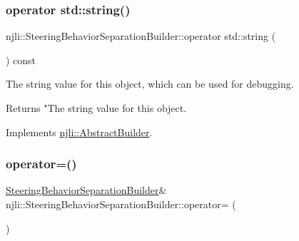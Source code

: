 \subsubsection{\texorpdfstring{operator std\+::string()}{operator std::string()}}
{\footnotesize\ttfamily njli\+::\+Steering\+Behavior\+Separation\+Builder\+::operator std\+::string (\begin{DoxyParamCaption}{ }\end{DoxyParamCaption}) const\hspace{0.3cm}{\ttfamily [virtual]}}

The string value for this object, which can be used for debugging.

\begin{DoxyReturn}{Returns}
"The string value for this object. 
\end{DoxyReturn}


Implements \mbox{\hyperlink{classnjli_1_1_abstract_builder_a3e6e553e06d1ca30517ad5fb0bd4d000}{njli\+::\+Abstract\+Builder}}.

\mbox{\label{classnjli_1_1_steering_behavior_separation_builder_a51689c329131ef5119e3c0c0d96a2c4a}} 
\subsubsection{\texorpdfstring{operator=()}{operator=()}}
{\footnotesize\ttfamily \mbox{\hyperlink{classnjli_1_1_steering_behavior_separation_builder}{Steering\+Behavior\+Separation\+Builder}}\& njli\+::\+Steering\+Behavior\+Separation\+Builder\+::operator= (\begin{DoxyParamCaption}\item[{const \mbox{\hyperlink{classnjli_1_1_steering_behavior_separation_builder}{Steering\+Behavior\+Separation\+Builder}} \&}]{ }\end{DoxyParamCaption})\hspace{0.3cm}{\ttfamily [protected]}}

\mbox{\label{classnjli_1_1_steering_behavior_separation_builder_a9c0a0f625cc3d56732df15284472ca89}} 

